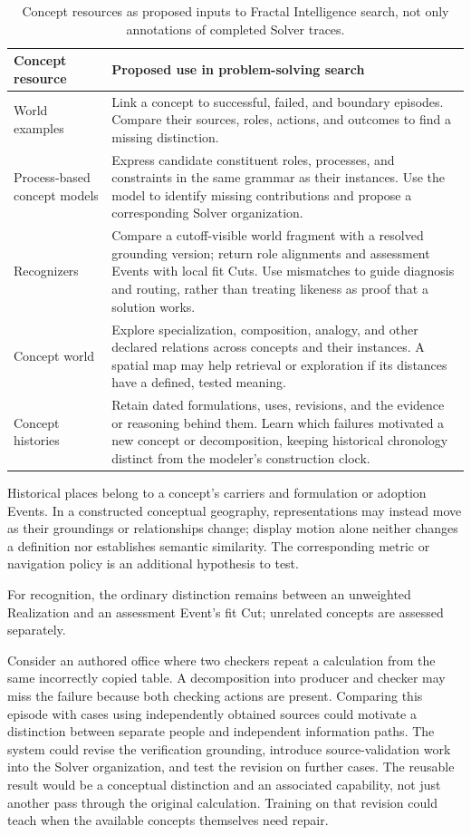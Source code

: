 \documentclass[10pt]{article}
\begin{document}
\begin{table}[!htbp]
\centering
\small
\begin{tabularx}{\textwidth}{@{}p{}Y@{}}
\toprule
Concept resource & Proposed use in problem-solving search \\
\midrule
World examples & Link a concept to successful, failed, and boundary episodes.
Compare their sources, roles, actions, and outcomes to find a missing distinction. \\
Process-based concept models & Express candidate constituent roles, processes, and
constraints in the same grammar as their instances. Use the model to identify
missing contributions and propose a corresponding Solver organization. \\
Recognizers & Compare a cutoff-visible world fragment with a resolved grounding
version; return role alignments and assessment Events with local fit Cuts.
Use mismatches to guide diagnosis and routing, rather than treating likeness
as proof that a solution works. \\
Concept world & Explore specialization, composition, analogy, and
other declared relations across concepts and their instances. A spatial map
may help retrieval or exploration if its distances have a defined, tested meaning. \\
Concept histories & Retain dated formulations, uses, revisions, and the evidence
or reasoning behind them. Learn which failures motivated a new concept or
decomposition, keeping historical chronology distinct from the modeler's
construction clock. \\
\bottomrule
\end{tabularx}
\caption{Concept resources as proposed inputs to Fractal Intelligence search,
not only annotations of completed Solver traces.}
\label{tab:concept-search-resources}
\end{table}

Historical places belong to a concept's carriers and formulation or adoption
Events. In a constructed conceptual geography, representations may instead
move as their groundings or relationships change; display motion alone neither
changes a definition nor establishes semantic similarity. The corresponding
metric or navigation policy is an additional hypothesis to test.

For recognition, the ordinary distinction remains between an unweighted Realization
and an assessment Event's fit Cut; unrelated concepts are assessed separately.

Consider an authored office where two checkers repeat a calculation from the
same incorrectly copied table. A decomposition into producer and checker may
miss the failure because both checking actions are present. Comparing this
episode with cases using independently obtained sources could motivate a
distinction between separate people and independent information paths. The
system could revise the verification grounding, introduce source-validation
work into the Solver organization, and test the revision on further cases.
The reusable result would be a conceptual distinction and an associated
capability, not just another pass through the original calculation. Training
on that revision could teach when the available concepts themselves need repair.
\end{document}
